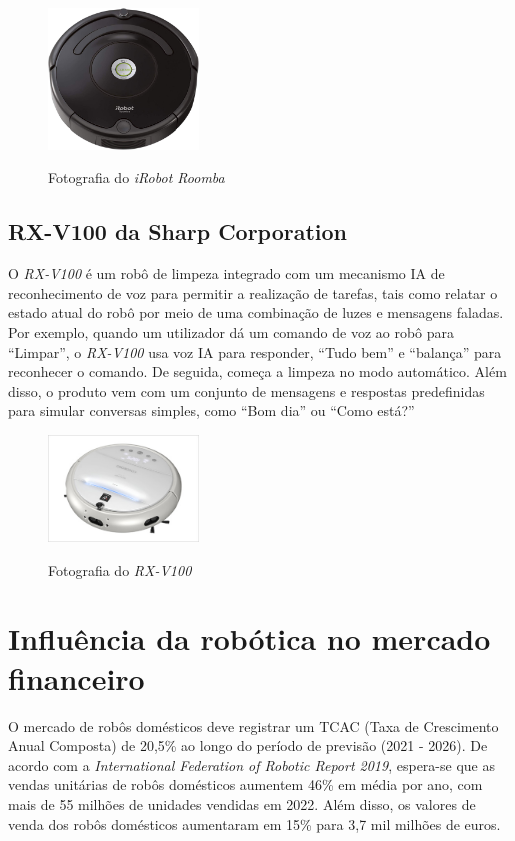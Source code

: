 \documentclass[10pt]{article}
\begin{document}
\begin{figure}[h]
\caption{Fotografia do \textit{iRobot Roomba}}
\centering
\includegraphics[width = 4cm]{img/5.1.jpg}
\label{figura:5.1}
\end{figure}

\subsection{RX-V100 da Sharp Corporation}

\hspace{\parindent}O \textit{RX-V100} é um robô de limpeza integrado com um mecanismo IA de reconhecimento de voz para permitir a realização de tarefas, tais como relatar o estado atual do robô por meio de uma combinação de luzes e mensagens faladas. Por exemplo, quando um utilizador dá um comando de voz ao robô para “Limpar”, o \textit{RX-V100} usa voz IA para responder, “Tudo bem” e “balança” para reconhecer o comando. De seguida, começa a limpeza no modo automático. Além disso, o produto vem com um conjunto de mensagens e respostas predefinidas para simular conversas simples, como “Bom dia” ou “Como está?”

\begin{figure}[h]
\caption{Fotografia do \textit{RX-V100}}
\centering
\includegraphics[width = 4cm]{img/5.2.jpg}
\label{figura:5.2}
\end{figure}

\section{Influência da robótica no mercado financeiro}

\hspace{\parindent}O mercado de robôs domésticos deve registrar um TCAC (Taxa de Crescimento Anual Composta) de 20,5\% ao longo do período de previsão (2021 - 2026). De acordo com a \textit{International Federation of Robotic Report 2019}, espera-se que as vendas unitárias de robôs domésticos aumentem 46\% em média por ano, com mais de 55 milhões de unidades vendidas em 2022. Além disso, os valores de venda dos robôs domésticos aumentaram em 15\% para 3,7 mil milhões de euros. 
\end{document}
